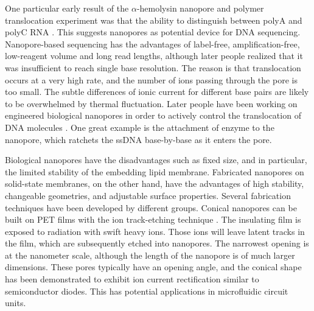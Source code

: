 One particular early result of the $\alpha$-hemolysin nanopore and polymer translocation experiment was that the ability to distinguish between polyA and polyC RNA \cite{Akeson1999,Meller2000}. This suggests nanopores as potential device for DNA sequencing. Nanopore-based sequencing has the advantages of label-free, amplification-free, low-reagent volume and long read lengths, although later people realized that it was insufficient to reach single base resolution. The reason is that translocation occurs at a very high rate, and the number of ions passing through the pore is too small. The subtle differences of ionic current for different base pairs are likely to be overwhelmed by thermal fluctuation. Later people have been working on engineered biological nanopores in order to actively control the translocation of DNA molecules  \cite{BayleyBook,gu1999stochastic,movileanu2000detecting,howorka2001sequence,benner2007sequence,cockroft2008single,lieberman2010processive}. One great example is the attachment of enzyme to the nanopore, which ratchets the ssDNA base-by-base as it enters the pore\cite{cockroft2008single}.

Biological nanopores have the disadvantages such as fixed size, and in particular, the limited stability of the embedding lipid membrane. Fabricated nanopores on solid-state membranes, on the other hand, have the advantages of high stability, changeable geometries, and adjustable surface properties. Several fabrication techniques have been developed by different groups. Conical nanopores can be built on PET films with the ion track-etching technique \cite{siwy2002fabrication}. The insulating film is exposed to radiation with swift heavy ions. Those ions will leave latent tracks in the film, which are subsequently etched into nanopores. The narrowest opening is at the nanometer scale, although the length of the nanopore is of much larger dimensions. These pores typically have an opening angle, and the conical shape has been demonstrated to exhibit ion current rectification similar to semiconductor diodes\cite{Siwy2004,siwy2006,Vlassiouk2007,Vlassiouk2008}. This has potential applications in microfluidic circuit units.

